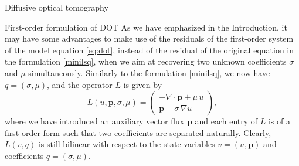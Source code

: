 \documentclass[11pt]{article}%
\renewcommand{\_}{{\fontfamily{ptm}\selectfont\textunderscore}}
\theoremstyle{plain}
\numberwithin{equation}{section}
\newcommand{\m}[1]{\ensuremath{\mathbf{#1}}}
\begin{document}
\begin{section}{Diffusive optical tomography}
\begin{subsection}{First-order formulation of DOT}
As we have emphasized in the Introduction, it may have some advantages to make use of 
the residuals of the first-order system of the model equation \eqref{eq:dot}, instead of the residual of the 
original equation in the formulation \eqref{minilsq}, when 
we aim at recovering two unknown coefficients $\sigma$ and $\mu$ simultaneously. 
Similarly to the formulation \eqref{minilsq}, we now have $ q=(\sigma, \mu)$, and the operator $L$ is given by 
\begin{equation}\label{opeL}
L(u,\m{p},\sigma,\mu)=\begin{pmatrix}
-\nabla\cdot \m{p}+\mu\,u\\
\m{p}-\sigma\,\nabla u
\end{pmatrix},
\end{equation}
where we have introduced an auxiliary vector flux $\m{p}$ and each entry of $L$ is of a first-order form such that two coefficients are separated naturally. Clearly, $L(v, q)$ is still bilinear with respect to the state variables 
$v=(u,\m{p})$ and coefficients $q=(\sigma, \mu)$.  %

\end{subsection}
\end{section}
\end{document}
